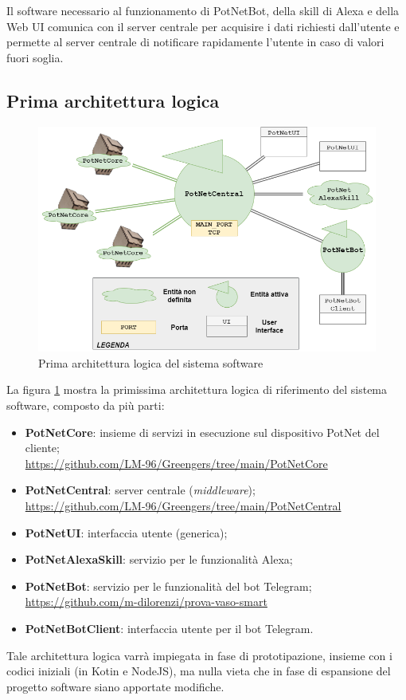 Il software necessario al funzionamento di PotNetBot, della skill di Alexa e della Web UI comunica con il server centrale per acquisire i dati richiesti dall'utente e permette al server centrale di notificare rapidamente l'utente in caso di valori fuori soglia. 

\subsection{Prima architettura logica}
\begin{figure}[h]
	\centering
	\includegraphics[width=\textwidth]{images/logical_arch.png}
	\caption{Prima architettura logica del sistema software}
	\label{fig:logical_arch}
\end{figure}

La figura \ref{fig:logical_arch} mostra la primissima architettura logica di riferimento del sistema software, composto da più parti:
\begin{itemize}
	\item \textbf{PotNetCore}: insieme di servizi in esecuzione sul dispositivo PotNet del cliente;\\
	\url{https://github.com/LM-96/Greengers/tree/main/PotNetCore}
	
	\item \textbf{PotNetCentral}: server centrale (\textit{middleware});\\
	\url{https://github.com/LM-96/Greengers/tree/main/PotNetCentral}
	\item \textbf{PotNetUI}: interfaccia utente (generica);
	
	\item \textbf{PotNetAlexaSkill}: servizio per le funzionalità Alexa;
	
	\item \textbf{PotNetBot}: servizio per le funzionalità del bot Telegram;\\
	\url{https://github.com/m-dilorenzi/prova-vaso-smart}
	
	\item \textbf{PotNetBotClient}: interfaccia utente per il bot Telegram.
\end{itemize}
Tale architettura logica varrà impiegata in fase di prototipazione, insieme con i codici iniziali (in Kotin e NodeJS), ma nulla vieta che in fase di espansione del progetto software siano apportate modifiche.

